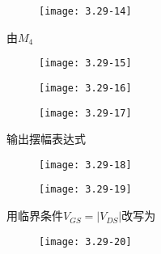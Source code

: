 		\begin{figure}[H] %
	\begin{minipage}{\linewidth}
		\texttt{[image: 3.29-14]}
	\end{minipage}
\end{figure}

由$M_4$

		\begin{figure}[H] %
	\begin{minipage}{\linewidth}
		\texttt{[image: 3.29-15]}
	\end{minipage}
\end{figure}

		\begin{figure}[H] %
	\begin{minipage}{\linewidth}
		\texttt{[image: 3.29-16]}
	\end{minipage}
\end{figure}

		\begin{figure}[H] %
	\begin{minipage}{\linewidth}
		\texttt{[image: 3.29-17]}
	\end{minipage}
\end{figure}


输出摆幅表达式

		\begin{figure}[H] %
	\begin{minipage}{\linewidth}
		\texttt{[image: 3.29-18]}
	\end{minipage}
\end{figure}

		\begin{figure}[H] %
	\begin{minipage}{\linewidth}
		\texttt{[image: 3.29-19]}
	\end{minipage}
\end{figure}

用临界条件$V_{GS}=|V_{DS}|$改写为

		\begin{figure}[H] %
	\begin{minipage}{\linewidth}
		\texttt{[image: 3.29-20]}
	\end{minipage}
\end{figure}

